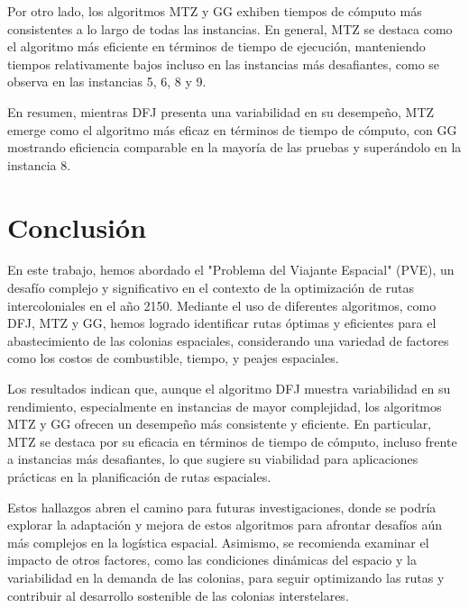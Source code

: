 \documentclass[
	spanish, %
	oneside
]{article}
\begin{document}
Por otro lado, los algoritmos MTZ y GG exhiben tiempos de cómputo más consistentes a lo largo de todas las instancias. En general, MTZ se destaca como el algoritmo más eficiente en términos de tiempo de ejecución, manteniendo tiempos relativamente bajos incluso en las instancias más desafiantes, como se observa en las instancias 5, 6, 8 y 9.

En resumen, mientras DFJ presenta una variabilidad en su desempeño, MTZ emerge como el algoritmo más eficaz en términos de tiempo de cómputo, con GG mostrando eficiencia comparable en la mayoría de las pruebas y superándolo en la instancia 8.


\newpage
\section*{Conclusión}

En este trabajo, hemos abordado el "Problema del Viajante Espacial" (PVE), un desafío complejo y significativo en el contexto de la optimización de rutas intercoloniales en el año 2150. Mediante el uso de diferentes algoritmos, como DFJ, MTZ y GG, hemos logrado identificar rutas óptimas y eficientes para el abastecimiento de las colonias espaciales, considerando una variedad de factores como los costos de combustible, tiempo, y peajes espaciales.
\vspace{12pt}

\noindent Los resultados indican que, aunque el algoritmo DFJ muestra variabilidad en su rendimiento, especialmente en instancias de mayor complejidad, los algoritmos MTZ y GG ofrecen un desempeño más consistente y eficiente. En particular, MTZ se destaca por su eficacia en términos de tiempo de cómputo, incluso frente a instancias más desafiantes, lo que sugiere su viabilidad para aplicaciones prácticas en la planificación de rutas espaciales.
\vspace{12pt}

\noindent Estos hallazgos abren el camino para futuras investigaciones, donde se podría explorar la adaptación y mejora de estos algoritmos para afrontar desafíos aún más complejos en la logística espacial. Asimismo, se recomienda examinar el impacto de otros factores, como las condiciones dinámicas del espacio y la variabilidad en la demanda de las colonias, para seguir optimizando las rutas y contribuir al desarrollo sostenible de las colonias interstelares.
\end{document}

